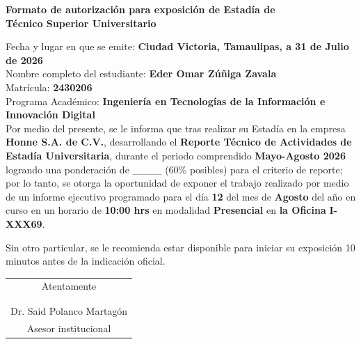 \documentclass[12pt]{article}
\newcommand{\NombreAlumno}{Eder Omar Zúñiga Zavala}
\newcommand{\UnidadEconomica}{Honne S.A. de C.V.}
\newcommand{\nasesorinstitucional}{Dr. Said Polanco Martagón}
\newcommand{\Matricula}           {2430206}  %
\newcommand{\ncuatrimestre}{Mayo-Agosto 2026}
\newcommand{\fechaAutorizacionInforme}               {31 de Julio de 2026}
\newcommand{\DiaEvaluacionPesentacion}{12}
\newcommand{\MesEvaluacionPesentacion}{Agosto}
\newcommand{\HoraEvaluacionPesentacion}{10:00 hrs}
\newcommand{\modalidadEvaluacionPesentacion}{Presencial} %
\newcommand{\tipoAulaOficinaEnlacePesentacion}{la Oficina} %
\newcommand{\AulaEvaluacionOEnlaceMeetPesentacion}{I-XXX69} %
\newcommand{\ncarrera}            {Ingeniería en Tecnologías de la Información e Innovación Digital}
\begin{document}
\begin{center}
{\Large \textbf{Formato de autorización para exposición de Estadía de}}\\[0.125cm]
{\Large \textbf{Técnico Superior Universitario}}\\[0.25cm]
\end{center}

\noindent
Fecha y lugar en que se emite: \textbf{Ciudad Victoria, Tamaulipas, a \fechaAutorizacionInforme } \\[0.125cm]
Nombre completo del estudiante: \textbf{\NombreAlumno} \\[0.125cm]
Matrícula: \textbf{\Matricula}  \\[0.125cm]
Programa Académico: \textbf{\ncarrera}  \\[0.25cm]

\noindent
Por medio del presente, se le informa que tras realizar su Estadía en la empresa \textbf{\UnidadEconomica}, desarrollando el \textbf{Reporte Técnico de Actividades de Estadía Universitaria}, durante el periodo comprendido \textbf{\ncuatrimestre} logrando una ponderación de \_\_\_\_  (60\% posibles) para el criterio de reporte; por lo tanto, se otorga la oportunidad de exponer el trabajo realizado por medio de un informe ejecutivo programado para el día \textbf{\DiaEvaluacionPesentacion} del mes de \textbf{\MesEvaluacionPesentacion} del año en curso en un horario de \textbf{\HoraEvaluacionPesentacion} en modalidad \textbf{\modalidadEvaluacionPesentacion} en \textbf{\tipoAulaOficinaEnlacePesentacion} \textbf{\AulaEvaluacionOEnlaceMeetPesentacion}.

\vspace{0.25cm}

\noindent
Sin otro particular, se le recomienda estar disponible para iniciar su exposición 10 minutos antes de la indicación oficial.

\vspace{0.5cm}

\begin{center}
\begin{tabular}{p{10cm}}
\multicolumn{1}{c}{Atentamente}   \\
 \\
 \\ \hline
\multicolumn{1}{c}{\nasesorinstitucional}   \\
\multicolumn{1}{c}{Asesor institucional}   \\
\end{tabular}
\end{center}
\end{document}
